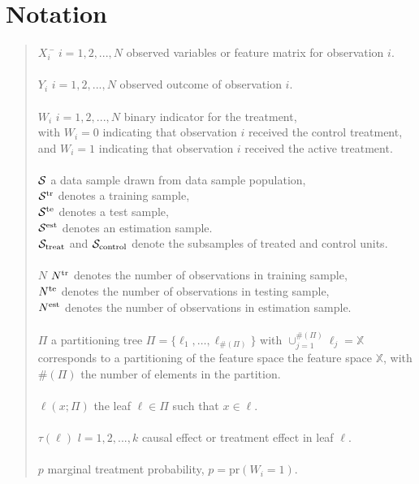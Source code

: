 \documentclass[11pt]{article}
\newcommand{\est}{{\rm est}}
\newcommand{\calp}{{\Pi}}
\newcommand{\cals}{{\cal S}}
\newcommand{\train}{{\rm tr}}
\newcommand{\test}{{\rm te}}
\begin{document}
\section{Notation}
\begin{quote}
\begin{tabbing}
$X_i$ \qquad\qquad \= $i = 1, 2,..., N$ \qquad observed variables or feature matrix for observation $i$.\\
\\
$Y_i$ \> $i = 1, 2, ..., N$ \qquad observed outcome of observation $i$.\\
\\
$W_i$ \>$i = 1, 2, ..., N$ \qquad binary indicator for the treatment,\\
\>with $W_i = 0$ indicating that observation $i$ received the control treatment, \\
\>and $W_i = 1$ indicating that observation $i$ received the active treatment.\\
\\
$\cals$ \> a data sample drawn from data sample population, \\
\> $\cals^{\text{tr}}$ denotes a training sample,\\
\> $\cals^{\text{te}}$ denotes a test sample, \\
\> $\cals^{\text{est}}$ denotes an estimation sample.\\
\> $\cals_{\text{treat}}$ and $\cals_{\text{control}}$ denote the subsamples of treated and control units.\\
\\
$N$
\> $N^\train$ denotes the number of observations in training sample,\\
\> $N^\test$ denotes the number of observations in testing sample,\\
\> $N^\est$ denotes the number of observations in estimation sample.\\
\\
$\Pi$ \>  a partitioning tree $\calp=\{\ell_1,\ldots,\ell_{\#(\Pi)}\}$ with $\cup_{j=1}^{\#(\calp)} \ell_j=\mathbb{X}$ \\
\> corresponds to a partitioning of the feature space the feature space $\mathbb{X}$, with\\
\> $\#(\calp)$ the number of elements in the partition.\\
\\
$\ell(x; \calp)$ \> the leaf $\ell \in \calp$ such that $x \in \ell$.\\
\\

$\tau(\ell)$ \> $l = 1, 2, ..., k$ \qquad causal effect or treatment effect in leaf $\ell$. \\
\\
$p$ \> marginal treatment probability, $p = \text{pr}(W_i = 1)$.

\end{tabbing}
\end{quote}
\end{document}

